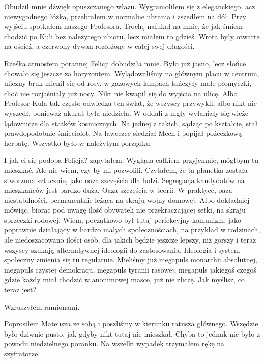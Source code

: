 Obudził mnie dźwięk opuszczanego włazu.
Wygramoliłem się z eleganckiego, acz niewygodnego łóżka, przebrałem w normalne ubrania i zszedłem na dół.
Przy wyjściu spotkałem naszego Profesora.
Trochę nafukał na mnie, że jak śmiem chodzić po Kuli bez należytego ubioru, lecz miałem to gdzieś.
Wrota były otwarte na oścież, a czerwony dywan rozłożony w całej swej długości.

Rześka atmosfera porannej Felicji dobudziła mnie. Było już jasno, lecz słońce chowało się jeszcze za horyzontem.
Wylądowaliśmy na głównym placu w centrum, uliczny bruk mienił się od rosy, w gazowych lampach tańczyły małe płomyczki, choć nie rozjaśniały już nocy.
Nikt nie kwapił się do wyjścia na ulicę. Albo Profesor Kula tak często odwiedza ten świat, że wszyscy przywykli, albo nikt nie wyszedł, ponieważ akurat była niedziela.
W oddali z mgły wyłaniały się wieże lądownicze dla statków kosmicznych. Na jednej z takich, sądząc po kształcie, stał prawdopodobnie śmieciolot.
Na ławeczce siedział Mech i popijał pożeczkową herbatę.
Wszystko było w należytym porządku.
\begin{dialogue}
\ds{} I jak ci się podoba Felicja? \dm{} zapytałem.
\ds{} Wygląda całkiem przyjemnie, mógłbym tu mieszkać. Ale nie wiem, czy by mi pozwolili. Czytałem, że ta planetka została stworzona sztucznie, jako oaza szczęścia dla ludzi. 
Segregacja kandydatów na mieszkańców jest bardzo duża.
\ds{} Oaza szczęścia w teorii. W praktyce, oaza niestabilności, permanentnie leżąca na skraju wojny domowej. 
Albo dokładniej mówiąc, biorąc pod uwagę ilość obywateli nie przekraczającej setki, na skraju sprzeczki rodowej.
\ds{} Wiem, początkowo był tutaj perfekcyjny komunizm, jako poprawnie działający w bardzo małych społecznościach, na przykład w rodzinach, 
ale niedoszacowano ilości osób, dla jakich będzie jeszcze lepszy, niż gorszy i teraz wszyscy szukają alternatywnej ideologii do zastosowania.
\ds{} Ideologia i system społeczny zmienia się tu regularnie. 
Mieliśmy już megapuls monarchii absolutnej, megapuls czystej demokracji, megapuls tyranii rasowej, megapuls jakiegoś czegoś gdzie każdy miał chodzić w anonimowej masce, już nie zliczę.
\ds{} Jak myślisz, co teraz jest?
\end{dialogue}
Wzruszyłem ramionami.

Poprosiłem Mateusza ze sobą i poszliśmy w kierunku ratusza głównego.
Wszędzie było dziwnie pusto, jak gdyby nikt tutaj nie mieszkał. 
Chyba to jednak nie było z powodu niedzielnego poranku.
Na wszelki wypadek trzymałem rękę na szyfratorze.


